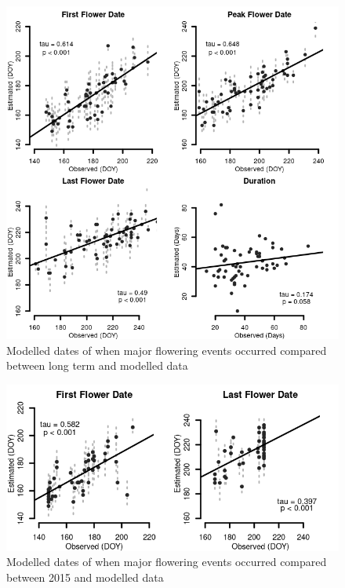 \documentclass[
]{article}
\begin{document}
\begin{figure}
\includegraphics[width=1\linewidth]{../graphics/plots/phenology_estimates_10_90} \caption{Modelled dates of when major flowering events occurred compared between long term and modelled data}\label{fig:plot phenology estimates}
\end{figure}

\begin{figure}
\includegraphics[width=1\linewidth]{../graphics/plots/phenology_estimates-jeo_10_90} \caption{Modelled dates of when major flowering events occurred compared between 2015 and modelled data}\label{fig:plot phenology estimates JEO}
\end{figure}
\end{document}
